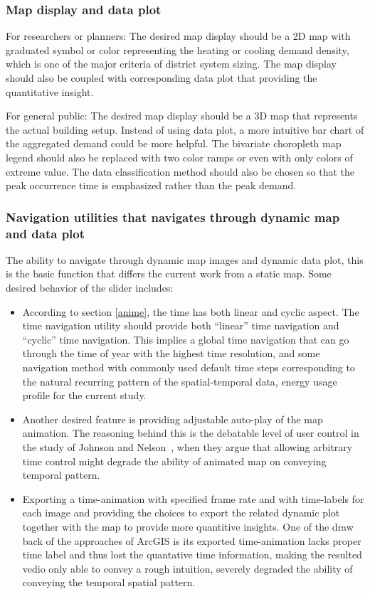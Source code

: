 \documentclass[hidelinks,12pt]{article}
\begin{document}
\subsubsection{Map display and data plot}
For researchers or planners: The desired map display should be a 2D
map with graduated symbol or color representing the heating or cooling
demand density, which is one of the major criteria of district system
sizing.  The map display should also be coupled with corresponding
data plot that providing the quantitative insight.

For general public: The desired map display should be a 3D map that
represents the actual building setup. Instead of using data plot, a
more intuitive bar chart of the aggregated demand could be more
helpful. The bivariate choropleth map legend should also be replaced
with two color ramps or even with only colors of extreme value. The
data classification method should also be chosen so that the peak
occurrence time is emphasized rather than the peak demand.

\subsubsection{Navigation utilities that navigates through dynamic map
  and data plot}
The ability to navigate through dynamic map images and dynamic data
plot, this is the basic function that differs the current work from a
static map. Some desired behavior of the slider includes:
\begin{itemize}
\item According to section \ref{anime}, the time has both linear and
  cyclic aspect. The time navigation utility should provide both
  ``linear'' time navigation and ``cyclic'' time navigation. This
  implies a global time navigation that can go through the time of
  year with the highest time resolution, and some navigation method
  with commonly used default time steps corresponding to the natural
  recurring pattern of the spatial-temporal data, energy usage profile
  for the current study.
\item Another desired feature is providing adjustable auto-play of the
  map animation. The reasoning behind this is the debatable level of
  user control in the study of Johnson and Nelson~\cite{Nelson1998},
  when they argue that allowing arbitrary time control might degrade
  the ability of animated map on conveying temporal pattern.
\item Exporting a time-animation with specified frame rate and with
  time-labels for each image and providing the choices to export the
  related dynamic plot together with the map to provide more
  quantitive insights. One of the draw back of the approaches of
  ArcGIS is its exported time-animation lacks proper time label and
  thus lost the quantative time information, making the resulted vedio
  only able to convey a rough intuition, severely degraded the ability
  of conveying the temporal spatial pattern.
\end{itemize}
\end{document}
